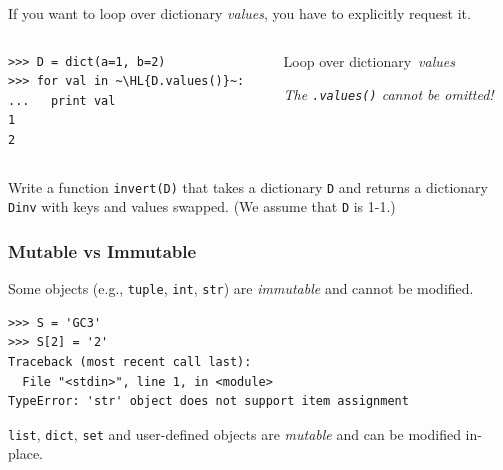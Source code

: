 \documentclass[english,serif,mathserif,xcolor=pdftex,dvipsnames,table]{beamer}
\begin{document}
\begin{frame}[fragile]
  If you want to loop over dictionary \emph{values}, you have to
  explicitly request it.

  \+
  \begin{columns}[c]
    \begin{column}{0.5\textwidth}
\begin{lstlisting}
>>> D = dict(a=1, b=2)
>>> for val in ~\HL{D.values()}~:
...   print val
1
2
\end{lstlisting}
    \end{column}
    \begin{column}{0.4\textwidth}
      \raggedleft
      Loop over dictionary~\emph{values}

      \emph{The \texttt{.values()} cannot be omitted!}
    \end{column}
  \end{columns}
\end{frame}

\begin{frame}
    \begin{exercise}
    Write a function \texttt{invert(D)} that takes a dictionary
    \texttt{D} and returns a dictionary \texttt{Dinv} with keys and
    values swapped. (We assume that \texttt{D} is 1-1.)
  \end{exercise}
\end{frame}


\begin{frame}[fragile]
  \frametitle{Mutable vs Immutable}
  Some objects (e.g., \texttt{tuple}, \texttt{int}, \texttt{str})
  are \emph{immutable} and cannot be modified.
\begin{lstlisting}
>>> S = 'GC3'
>>> S[2] = '2'
Traceback (most recent call last):
  File "<stdin>", line 1, in <module>
TypeError: 'str' object does not support item assignment
\end{lstlisting}


  \+
  \texttt{list}, \texttt{dict}, \texttt{set} and user-defined objects
  are \emph{mutable} and can be modified in-place.
\end{frame}
\end{document}
